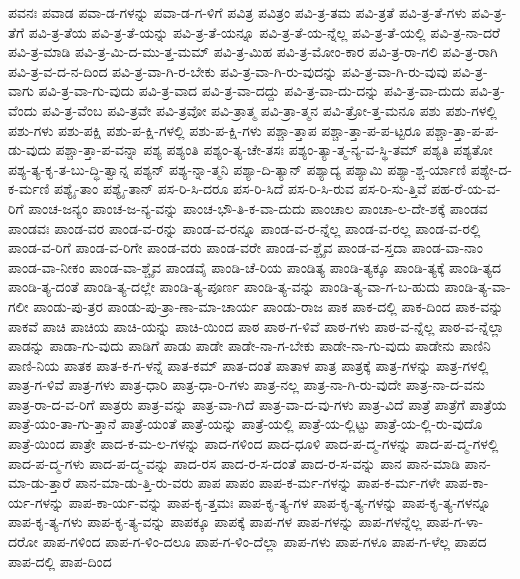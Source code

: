 {ಪವನಃ
ಪವಾಡ
ಪವಾ-ಡ-ಗಳನ್ನು
ಪವಾ-ಡ-ಗ-ಳಿಗೆ
ಪವಿತ್ರ
ಪವಿತ್ರಂ
ಪವಿ-ತ್ರ-ತಮ
ಪವಿ-ತ್ರತೆ
ಪವಿ-ತ್ರ-ತೆ-ಗಳು
ಪವಿ-ತ್ರ-ತೆಗೆ
ಪವಿ-ತ್ರ-ತೆಯ
ಪವಿ-ತ್ರ-ತೆ-ಯನ್ನು
ಪವಿ-ತ್ರ-ತೆ-ಯನ್ನೂ
ಪವಿ-ತ್ರ-ತೆ-ಯ-ನ್ನೆಲ್ಲ
ಪವಿ-ತ್ರ-ತೆ-ಯಲ್ಲಿ
ಪವಿ-ತ್ರ-ನಾ-ದರೆ
ಪವಿ-ತ್ರ-ಮಾಡಿ
ಪವಿ-ತ್ರ-ಮಿ-ದ-ಮು-ತ್ತ-ಮಮ್
ಪವಿ-ತ್ರ-ಮಿಹ
ಪವಿ-ತ್ರ-ಮೋಂ-ಕಾರ
ಪವಿ-ತ್ರ-ರಾ-ಗಲಿ
ಪವಿ-ತ್ರ-ರಾಗಿ
ಪವಿ-ತ್ರ-ವ-ದ-ನ-ದಿಂದ
ಪವಿ-ತ್ರ-ವಾ-ಗಿ-ರ-ಬೇಕು
ಪವಿ-ತ್ರ-ವಾ-ಗಿ-ರು-ವುದನ್ನು
ಪವಿ-ತ್ರ-ವಾ-ಗಿ-ರು-ವುವು
ಪವಿ-ತ್ರ-ವಾಗು
ಪವಿ-ತ್ರ-ವಾ-ಗು-ವುದು
ಪವಿ-ತ್ರ-ವಾದ
ಪವಿ-ತ್ರ-ವಾ-ದದ್ದು
ಪವಿ-ತ್ರ-ವಾ-ದು-ದನ್ನು
ಪವಿ-ತ್ರ-ವಾ-ದುದು
ಪವಿ-ತ್ರ-ವೆಂದು
ಪವಿ-ತ್ರ-ವೆಂಬ
ಪವಿ-ತ್ರವೇ
ಪವಿ-ತ್ರವೋ
ಪವಿ-ತ್ರಾತ್ಮ
ಪವಿ-ತ್ರಾ-ತ್ಮನ
ಪವಿ-ತ್ರೋ-ತ್ತ-ಮನೂ
ಪಶು
ಪಶು-ಗಳಲ್ಲಿ
ಪಶು-ಗಳು
ಪಶು-ಪಕ್ಷಿ
ಪಶು-ಪ-ಕ್ಷಿ-ಗಳಲ್ಲಿ
ಪಶು-ಪ-ಕ್ಷಿ-ಗಳು
ಪಶ್ಚಾ-ತ್ತಾಪ
ಪಶ್ಚಾ-ತ್ತಾ-ಪ-ಪ-ಟ್ಟರೂ
ಪಶ್ಚಾ-ತ್ತಾ-ಪ-ಪ-ಡು-ವುದು
ಪಶ್ಚಾ-ತ್ತಾ-ಪ-ವನ್ನಾ
ಪಶ್ಯ
ಪಶ್ಯಂತಿ
ಪಶ್ಯಂ-ತ್ಯ-ಚೇ-ತಸಃ
ಪಶ್ಯಂ-ತ್ಯಾ-ತ್ಮ-ನ್ಯ-ವ-ಸ್ಥಿ-ತಮ್
ಪಶ್ಯತಿ
ಪಶ್ಯತೋ
ಪಶ್ಯ-ತ್ಯ-ಕೃ-ತ-ಬು-ದ್ಧಿ-ತ್ವಾನ್ನ
ಪಶ್ಯನ್
ಪಶ್ಯ-ನ್ನಾ-ತ್ಮನಿ
ಪಶ್ಯಾ-ದಿ-ತ್ಯಾನ್
ಪಶ್ಯಾದ್ಯ
ಪಶ್ಯಾಮಿ
ಪಶ್ಯಾ-ಶ್ಚ-ರ್ಯಾಣಿ
ಪಶ್ಯೇ-ದ-ಕ-ರ್ಮಣಿ
ಪಶ್ಯೈ-ತಾಂ
ಪಶ್ಯೈ-ತಾನ್
ಪಸ-ರಿ-ಸಿ-ದರೂ
ಪಸ-ರಿ-ಸಿದೆ
ಪಸ-ರಿ-ಸಿ-ರುವ
ಪಸ-ರಿ-ಸು-ತ್ತಿವೆ
ಪಹ-ರೆ-ಯ-ವ-ರಿಗೆ
ಪಾಂಚ-ಜನ್ಯಂ
ಪಾಂಚ-ಜ-ನ್ಯ-ವನ್ನು
ಪಾಂಚ-ಭೌ-ತಿ-ಕ-ವಾ-ದುದು
ಪಾಂಚಾಲ
ಪಾಂಚಾ-ಲ-ದೇ-ಶಕ್ಕೆ
ಪಾಂಡವ
ಪಾಂಡವಃ
ಪಾಂಡ-ವರ
ಪಾಂಡ-ವ-ರನ್ನು
ಪಾಂಡ-ವ-ರನ್ನೂ
ಪಾಂಡ-ವ-ರ-ನ್ನೆಲ್ಲ
ಪಾಂಡ-ವ-ರಲ್ಲ
ಪಾಂಡ-ವ-ರಲ್ಲಿ
ಪಾಂಡ-ವ-ರಿಗೆ
ಪಾಂಡ-ವ-ರಿಗೇ
ಪಾಂಡ-ವರು
ಪಾಂಡ-ವರೇ
ಪಾಂಡ-ವ-ಶ್ಚೈವ
ಪಾಂಡ-ವ-ಸ್ತದಾ
ಪಾಂಡ-ವಾ-ನಾಂ
ಪಾಂಡ-ವಾ-ನೀಕಂ
ಪಾಂಡ-ವಾ-ಶ್ಚೈವ
ಪಾಂಡವೈ
ಪಾಂಡಿ-ಚೆ-ರಿಯ
ಪಾಂಡಿತ್ಯ
ಪಾಂಡಿ-ತ್ಯಕ್ಕೂ
ಪಾಂಡಿ-ತ್ಯಕ್ಕೆ
ಪಾಂಡಿ-ತ್ಯದ
ಪಾಂಡಿ-ತ್ಯ-ದಂತೆ
ಪಾಂಡಿ-ತ್ಯ-ದಲ್ಲೇ
ಪಾಂಡಿ-ತ್ಯ-ಪೂರ್ಣ
ಪಾಂಡಿ-ತ್ಯ-ವನ್ನು
ಪಾಂಡಿ-ತ್ಯ-ವಾ-ಗ-ಬ-ಹುದು
ಪಾಂಡಿ-ತ್ಯ-ವಾ-ಗಲೀ
ಪಾಂಡು-ಪು-ತ್ರರ
ಪಾಂಡು-ಪು-ತ್ರಾ-ಣಾ-ಮಾ-ಚಾರ್ಯ
ಪಾಂಡು-ರಾಜ
ಪಾಕ
ಪಾಕ-ದಲ್ಲಿ
ಪಾಕ-ದಿಂದ
ಪಾಕ-ವನ್ನು
ಪಾಕವೆ
ಪಾಚಿ
ಪಾಚಿಯ
ಪಾಚಿ-ಯನ್ನು
ಪಾಚಿ-ಯಿಂದ
ಪಾಠ
ಪಾಠ-ಗ-ಳಿವೆ
ಪಾಠ-ಗಳು
ಪಾಠ-ವ-ನ್ನೆಲ್ಲ
ಪಾಠ-ವ-ನ್ನೆಲ್ಲಾ
ಪಾಡನ್ನು
ಪಾಡಾ-ಗು-ವುದು
ಪಾಡಿಗೆ
ಪಾಡು
ಪಾಡೇ
ಪಾಡೇ-ನಾ-ಗ-ಬೇಕು
ಪಾಡೇ-ನಾ-ಗು-ವುದು
ಪಾಡೇನು
ಪಾಣಿನಿ
ಪಾಣಿ-ನಿಯ
ಪಾತಕ
ಪಾತ-ಕ-ಗ-ಳನ್ನೆ
ಪಾತ-ಕಮ್
ಪಾತ-ದಂತೆ
ಪಾತಾಳ
ಪಾತ್ರ
ಪಾತ್ರಕ್ಕೆ
ಪಾತ್ರ-ಗಳನ್ನು
ಪಾತ್ರ-ಗಳಲ್ಲಿ
ಪಾತ್ರ-ಗ-ಳಿವೆ
ಪಾತ್ರ-ಗಳು
ಪಾತ್ರ-ಧಾರಿ
ಪಾತ್ರ-ಧಾ-ರಿ-ಗಳು
ಪಾತ್ರ-ನಲ್ಲ
ಪಾತ್ರ-ನಾ-ಗಿ-ರು-ವುದೇ
ಪಾತ್ರ-ನಾ-ದ-ವನು
ಪಾತ್ರ-ರಾ-ದ-ವ-ರಿಗೆ
ಪಾತ್ರರು
ಪಾತ್ರ-ವನ್ನು
ಪಾತ್ರ-ವಾ-ಗಿದೆ
ಪಾತ್ರ-ವಾ-ದ-ವು-ಗಳು
ಪಾತ್ರ-ವಿದೆ
ಪಾತ್ರೆ
ಪಾತ್ರೆಗೆ
ಪಾತ್ರೆಯ
ಪಾತ್ರೆ-ಯಂ-ತಾ-ಗು-ತ್ತಾನೆ
ಪಾತ್ರೆ-ಯಂತೆ
ಪಾತ್ರೆ-ಯನ್ನು
ಪಾತ್ರೆ-ಯಲ್ಲಿ
ಪಾತ್ರೆ-ಯ-ಲ್ಲಿಟ್ಟು
ಪಾತ್ರೆ-ಯ-ಲ್ಲಿ-ರು-ವುದೊ
ಪಾತ್ರೆ-ಯಿಂದ
ಪಾತ್ರೇ
ಪಾದ-ಕ-ಮ-ಲ-ಗಳನ್ನು
ಪಾದ-ಗಳಿಂದ
ಪಾದ-ಧೂಳಿ
ಪಾದ-ಪ-ದ್ಮ-ಗಳನ್ನು
ಪಾದ-ಪ-ದ್ಮ-ಗಳಲ್ಲಿ
ಪಾದ-ಪ-ದ್ಮ-ಗಳು
ಪಾದ-ಪ-ದ್ಮ-ವನ್ನು
ಪಾದ-ರಸ
ಪಾದ-ರ-ಸ-ದಂತೆ
ಪಾದ-ರ-ಸ-ವನ್ನು
ಪಾನ
ಪಾನ-ಮಾಡಿ
ಪಾನ-ಮಾ-ಡು-ತ್ತಾರೆ
ಪಾನ-ಮಾ-ಡು-ತ್ತಿ-ರು-ವರು
ಪಾಪ
ಪಾಪಂ
ಪಾಪ-ಕ-ರ್ಮ-ಗಳನ್ನು
ಪಾಪ-ಕ-ರ್ಮ-ಗಳೇ
ಪಾಪ-ಕಾ-ರ್ಯ-ಗಳನ್ನು
ಪಾಪ-ಕಾ-ರ್ಯ-ವನ್ನು
ಪಾಪ-ಕೃ-ತ್ತಮಃ
ಪಾಪ-ಕೃ-ತ್ಯ-ಗಳ
ಪಾಪ-ಕೃ-ತ್ಯ-ಗಳನ್ನು
ಪಾಪ-ಕೃ-ತ್ಯ-ಗಳನ್ನೂ
ಪಾಪ-ಕೃ-ತ್ಯ-ಗಳು
ಪಾಪ-ಕೃ-ತ್ಯ-ವನ್ನು
ಪಾಪಕ್ಕೂ
ಪಾಪಕ್ಕೆ
ಪಾಪ-ಗಳ
ಪಾಪ-ಗಳನ್ನು
ಪಾಪ-ಗಳನ್ನೆಲ್ಲ
ಪಾಪ-ಗ-ಳಾ-ದರೋ
ಪಾಪ-ಗಳಿಂದ
ಪಾಪ-ಗ-ಳಿಂ-ದಲೂ
ಪಾಪ-ಗ-ಳಿಂ-ದೆಲ್ಲಾ
ಪಾಪ-ಗಳು
ಪಾಪ-ಗಳೂ
ಪಾಪ-ಗ-ಳೆಲ್ಲ
ಪಾಪದ
ಪಾಪ-ದಲ್ಲಿ
ಪಾಪ-ದಿಂದ
}
